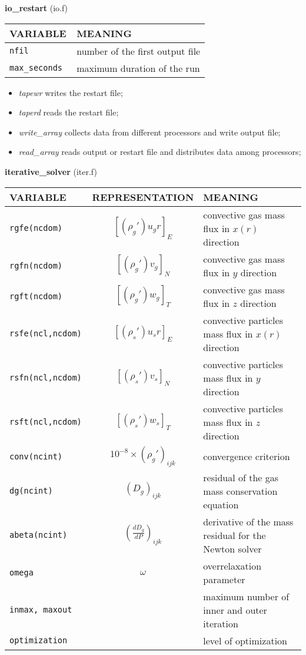 %
{\large{\bf io\_restart}} (io.f)\\[5mm]
\begin{tabular}{|p{6cm}|p{6cm}|}\hline
VARIABLE & MEANING\\\hline
\tt nfil & number of the first output file \\ \hline
\tt max\_seconds & maximum duration of the run \\ \hline
\end{tabular}
\begin{itemize}
\item{\em tapewr} writes the restart file;
\item{\em taperd} reads the restart file;
\item{\em write\_array} collects data from different processors and write output file;
\item{\em read\_array}  reads output or restart file and distributes data among processors;
\end{itemize}
%
%
{\large{\bf iterative\_solver}} (iter.f)\\[5mm]
\begin{tabular}{|p{6cm}|c|p{6cm}|}\hline
VARIABLE & REPRESENTATION & MEANING\\\hline
\tt rgfe(ncdom) & $\left[ (\rho_g')u_g r \right]_{E} $ & convective gas mass flux in $x(r)$ direction\\\hline
\tt rgfn(ncdom) & $\left[ (\rho_g')v_g \right]_{N} $ & convective gas mass flux in $y$ direction\\\hline
\tt rgft(ncdom) & $\left[ (\rho_g')w_g \right]_{T} $ & convective gas mass flux in $z$ direction\\\hline
\tt rsfe(ncl,ncdom) & $\left[ (\rho_s')u_s r \right]_{E} $ & convective particles mass flux in $x(r)$ direction\\\hline
\tt rsfn(ncl,ncdom) & $\left[ (\rho_s')v_s \right]_{N} $ & convective particles mass flux in $y$ direction\\\hline
\tt rsft(ncl,ncdom) & $\left[ (\rho_s')w_s \right]_{T} $ & convective particles mass flux in $z$ direction\\\hline
\tt conv(ncint) & $10^{-8}\times(\rho_g')_{ijk}$ & convergence criterion\\\hline
\tt dg(ncint) & $(D_g)_{ijk}$ & residual of the gas mass conservation equation \\\hline
\tt abeta(ncint) & $\left(\frac{dD_g}{dP}\right)_{ijk}$ & derivative of the mass residual for the Newton solver\\\hline
\tt omega & $\omega$ & overrelaxation parameter \\\hline
\tt inmax, maxout && maximum number of inner and outer iteration\\\hline
\tt optimization && level of optimization\\\hline
\end{tabular}\\
